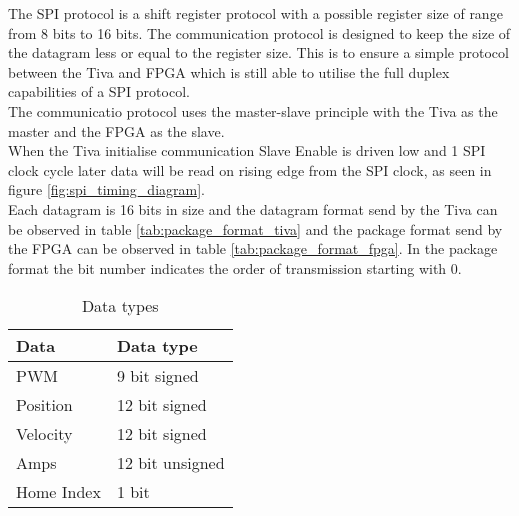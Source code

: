 \documentclass[../../../main]{subfiles}
\begin{document}
The SPI protocol is a shift register protocol with a possible register size of range from 8 bits to 16 bits.
The communication protocol is designed to keep the size of the datagram less or equal to the register size. This is to ensure a simple protocol between the Tiva and FPGA which is still able to utilise the full duplex capabilities of a SPI protocol. \\
The communicatio protocol uses the master-slave principle with the Tiva as the master and the FPGA as the slave.\\
When the Tiva initialise communication Slave Enable is driven low and 1 SPI clock cycle later
data will be read on rising edge from the SPI clock, as seen in figure \ref{fig:spi_timing_diagram}.
\\
Each datagram is 16 bits in size and the datagram format send by the Tiva
can be observed in table \ref{tab:package_format_tiva} and the package format send by the FPGA
can be observed in table \ref{tab:package_format_fpga}.
In the package format the bit number indicates the order of transmission starting with 0.

\begin{table}[h]
	\centering
	\begin{tabular}{ll}
		\textbf{Data}& \textbf{Data type}  \\
		\hline
		PWM& 9 bit signed \\
		Position& 12 bit signed \\
		Velocity& 12 bit signed \\
		Amps& 12 bit unsigned \\
		Home Index& 1 bit
	\end{tabular}
	\caption{Data types}
	\label{tab:spi_datatypes}
\end{table}
\end{document}
